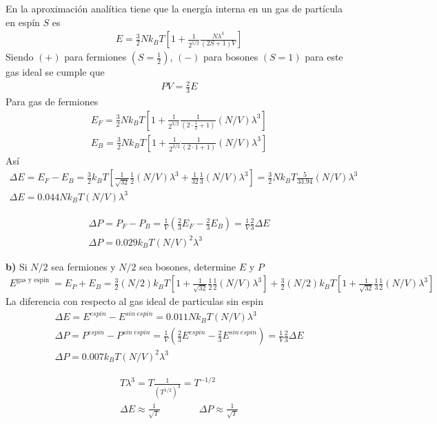 \documentclass{article}
\begin{document}
 En la aproximación analítica tiene que la energía interna en un gas de partícula en espín $ S  $ es 
 \begin{gather*}
  E = \frac{3 }{2} Nk_B T \left[1 + \frac{1 }{2 ^ {5/2 }} \frac{N \lambda^3 }{(2S + 1 )V }\right] 
 \end{gather*}
 Siendo $ (+ ) $ para fermiones $ (S = \frac{1}{2}) $, $ (- )  $ para bosones $ (S = 1 ) $ para este gas ideal se cumple que 
 \begin{gather*}
  PV = \frac{2 }{3 } E  
 \end{gather*}
 Para gas de fermiones 
 \begin{gather*}
  E_F = \frac{3 }{2 } Nk_B T \left[ 1 + \frac{1}{2 ^ {3/2 }} \frac{1}{(2 \cdot \frac{1}{2} + 1 )}(N/V ) \lambda^3 \right] \\
  E_B = \frac{3 }{2 } Nk_B T \left[ 1 + \frac{1}{2 ^ {3/2 }} \frac{1}{(2 \cdot 1 + 1 )}(N/V ) \lambda^3 \right] 
 \end{gather*}
 Así 
 \begin{gather*}
  \Delta E = E_F - E_B = \frac{3 }{2 } k_B T \left[\frac{1}{\sqrt{32 } } \frac{1}{2} (N/V)\lambda^3 + \frac{1}{32 }\frac{1}{3} (N/V)\lambda^3 \right] = \frac{3 }{2 } Nk_B T \frac{5}{33.94 } (N/V ) \lambda^3 \\
  \Delta E = 0.044 N k_B T (N/V) \lambda^3 
 \end{gather*}

 \hfill 

 \hfill 

 \begin{gather*}
  \Delta P = P_F  - P_B = \frac{1}{V } \left(\frac{2}{3} E_F - \frac{2}{3 } E_B \right) = \frac{1}{V } \frac{2}{3} \Delta E \\
  \Delta P = 0.029 k_B T (N/V)^2 \lambda^3 
 \end{gather*}

 \hfill 

 \hfill 

 \textbf{b) } Si $ N/2  $ sea fermiones y $ N/2  $ sea bosones, determine $ E  $ y $ P  $ 
 \begin{gather*}
  E ^ {\text{gas y espin }} = E_P + E_B = \frac{3}{2} (N/2) k_B T \left[1 + \frac{1}{\sqrt{32 } }\frac{1}{2} \frac{1}{2} (N/V) \lambda^3 \right] + \frac{3}{2} (N/2) k_B T \left[1 + \frac{1}{\sqrt{32 } }\frac{1}{3} \frac{1}{2} (N/V) \lambda^3 \right]
\end{gather*}
La diferencia con respecto al gas ideal de particulas sin espin 
\begin{gather*}
  \Delta E = E ^ {espin } - E ^ {sin\ espin } = 0.011 N k_B T (N/V) \lambda^3  \\
  \Delta P = P ^ {espin } - P ^ {sin\ espin } = \frac{1}{V } \left(\frac{2}{3 } E ^ {espin } - \frac{2}{3} E ^ {sin\ espin }\right) = \frac{1}{V} \frac{2}{3} \Delta E  \\
  \Delta P = 0.007 k_B T (N/V)^2 \lambda^3 
\end{gather*}

\hfill 

\hfill 

\begin{gather*}
  T \lambda^3  = T \frac{1}{(T ^ {1/2 })^3 } = T ^ {-1/2}\\
  \Delta E \approx \frac{1}{\sqrt{T } } \qquad \qquad \Delta P \approx \frac{1}{\sqrt{T} }
\end{gather*}
\end{document}
